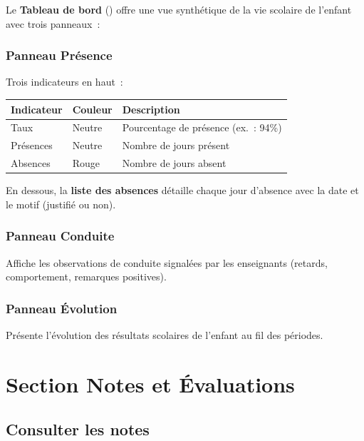 Le \textbf{Tableau de bord} (\faTachometerAlt) offre une vue synth\'etique de la vie scolaire de l'enfant avec trois panneaux~:

\subsection{Panneau Pr\'esence}

Trois indicateurs en haut~:

\begin{center}
\begin{tabularx}{\textwidth}{llX}
\toprule
\textbf{Indicateur} & \textbf{Couleur} & \textbf{Description} \\
\midrule
Taux & Neutre & Pourcentage de pr\'esence (ex.~: 94\%) \\
Pr\'esences & Neutre & Nombre de jours pr\'esent \\
Absences & Rouge & Nombre de jours absent \\
\bottomrule
\end{tabularx}
\end{center}

En dessous, la \textbf{liste des absences} d\'etaille chaque jour d'absence avec la date et le motif (justifi\'e ou non).

\subsection{Panneau Conduite}

Affiche les observations de conduite signal\'ees par les enseignants (retards, comportement, remarques positives).

\subsection{Panneau \'Evolution}

Pr\'esente l'\'evolution des r\'esultats scolaires de l'enfant au fil des p\'eriodes.

\newpage
\chapter{Section Notes et \'Evaluations}

\section{Consulter les notes}

